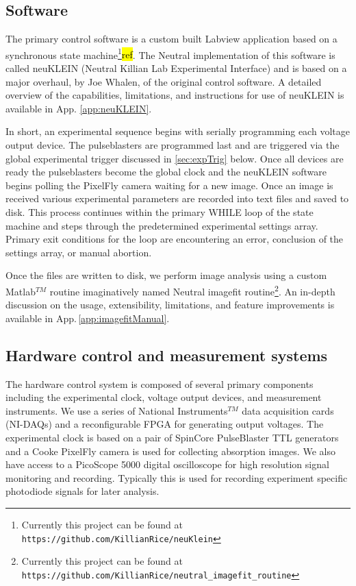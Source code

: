 \subsection{Software} \label{ssec:soft_sys}
The primary control software is a custom built Labview application based on a synchronous state machine\footnote{Currently this project can be found at \texttt{https://github.com/KillianRice/neuKlein}}\hl{ref}.
The Neutral implementation of this software is called neuKLEIN (Neutral Killian Lab Experimental Interface) and is based on a major overhaul, by Joe Whalen, of the original control software.
A detailed overview of the capabilities, limitations, and instructions for use of neuKLEIN is available in App. \ref{app:neuKLEIN}.

In short, an experimental sequence begins with serially programming each voltage output device.
The pulseblasters are programmed last and are triggered via the global experimental trigger discussed in \ref{sec:expTrig} below.
Once all devices are ready the pulseblasters become the global clock and the neuKLEIN software begins polling the PixelFly camera waiting for a new image.
Once an image is received various experimental parameters are recorded into text files and saved to disk.
This process continues within the primary WHILE loop of the state machine and steps through the predetermined experimental settings array.
Primary exit conditions for the loop are encountering an error, conclusion of the settings array, or manual abortion.

Once the files are written to disk, we perform image analysis using a custom Matlab$^{TM}$ routine imaginatively named Neutral imagefit routine\footnote{Currently this project can be found at \texttt{https://github.com/KillianRice/neutral\_imagefit\_routine}}.
An in-depth discussion on the usage, extensibility, limitations, and feature improvements is available in App.\,\ref{app:imagefitManual}.

\subsection{Hardware control and measurement systems} \label{ssec:comp_sys}
The hardware control system is composed of several primary components including the experimental clock, voltage output devices, and measurement instruments.
We use a series of National Instruments$^{TM}$ data acquisition cards (NI-DAQs) and a reconfigurable FPGA for generating output voltages.
The experimental clock is based on a pair of SpinCore PulseBlaster TTL generators and a Cooke PixelFly camera is used for collecting absorption images.
We also have access to a PicoScope 5000 digital oscilloscope for high resolution signal monitoring and recording. Typically this is used for recording experiment specific photodiode signals for later analysis.

